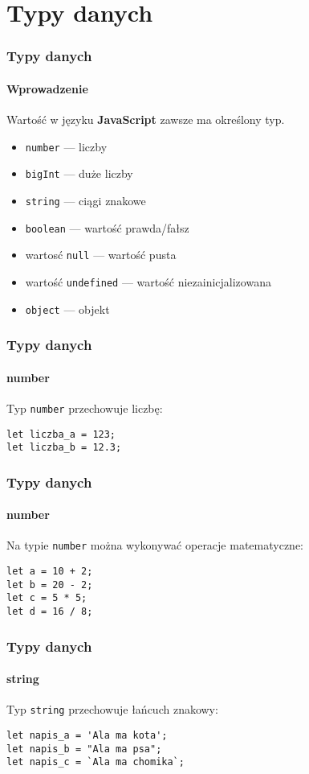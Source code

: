 \section{Typy danych}

\begin{frame}[fragile]
  \frametitle{Typy danych}
  \framesubtitle{Wprowadzenie}

  Wartość w języku \textbf{JavaScript} zawsze ma określony typ. 

  \begin{itemize}
    \item \verb|number| --- liczby
    \item \verb|bigInt| --- duże liczby
    \item \verb|string| --- ciągi znakowe
    \item \verb|boolean| --- wartość prawda/fałsz
    \item wartosć \verb|null| --- wartość pusta
    \item wartość \verb|undefined| --- wartość niezainicjalizowana
    \item \verb|object| --- objekt
  \end{itemize}

\end{frame}

\begin{frame}[fragile]
  \frametitle{Typy danych}
  \framesubtitle{number}

 Typ \verb|number| przechowuje liczbę:

  \begin{verbatim}
let liczba_a = 123;
let liczba_b = 12.3; 
  \end{verbatim}

\end{frame}


\begin{frame}[fragile]
  \frametitle{Typy danych}
  \framesubtitle{number}

 Na typie \verb|number| można wykonywać operacje matematyczne:

  \begin{verbatim}
let a = 10 + 2;
let b = 20 - 2;
let c = 5 * 5;
let d = 16 / 8;
  \end{verbatim}

\end{frame}


\begin{frame}[fragile]
  \frametitle{Typy danych}
  \framesubtitle{string}

 Typ \verb|string| przechowuje łańcuch znakowy:

  \begin{verbatim}
let napis_a = 'Ala ma kota';
let napis_b = "Ala ma psa";
let napis_c = `Ala ma chomika`;
  \end{verbatim}

\end{frame}


